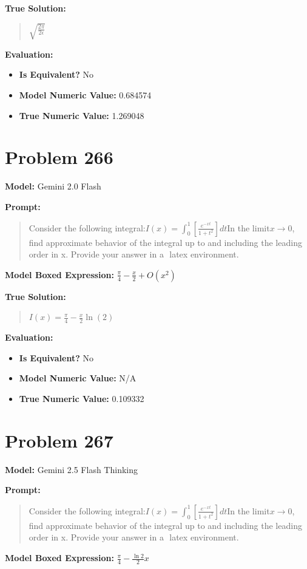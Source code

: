 \documentclass{article}
\begin{document}
{\textbf{True Solution:}
\begin{quote}
$\sqrt{\frac{2 \pi}{2 \epsilon}}$
\end{quote}

\textbf{Evaluation:}
\begin{itemize}
\item \textbf{Is Equivalent?} No
\item \textbf{Model Numeric Value:} 0.684574
\item \textbf{True Numeric Value:} 1.269048
\end{itemize}
\vspace{1cm}
\section*{Problem 266}
\textbf{Model:} Gemini 2.0 Flash

\textbf{Prompt:}
\begin{quote}
Consider the following integral:$I(x) = \int_0^1[\frac{e^{-xt}}{1+t^2}]dt$In the limit$x \rightarrow 0$, find approximate behavior of the integral up to and including the leading order in x. Provide your answer in a $\boxed{}$ latex environment.
\end{quote}
\textbf{Model Boxed Expression:} $\frac{\pi}{4} - \frac{x}{2} + O(x^2)$

\textbf{True Solution:}
\begin{quote}
$I(x) = \frac{\pi}{4}-\frac{x}{2}\ln(2)$
\end{quote}

\textbf{Evaluation:}
\begin{itemize}
\item \textbf{Is Equivalent?} No
\item \textbf{Model Numeric Value:} N/A
\item \textbf{True Numeric Value:} 0.109332
\end{itemize}
\vspace{1cm}
\section*{Problem 267}
\textbf{Model:} Gemini 2.5 Flash Thinking

\textbf{Prompt:}
\begin{quote}
Consider the following integral:$I(x) = \int_0^1[\frac{e^{-xt}}{1+t^2}]dt$In the limit$x \rightarrow 0$, find approximate behavior of the integral up to and including the leading order in x. Provide your answer in a $\boxed{}$ latex environment.
\end{quote}
\textbf{Model Boxed Expression:} $\frac{\pi}{4} - \frac{\ln 2}{2}x$

}
\end{document}
